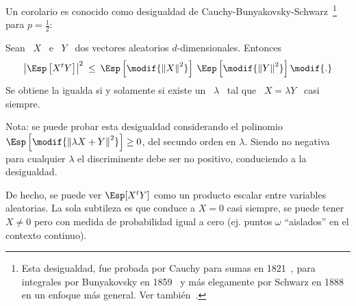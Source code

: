 Un       corolario       es       conocido       como       desigualdad       de
Cauchy-Bunyakovsky-Schwarz~\footnote{Esta  desigualdad, fue  probada  por Cauchy
  para  sumas   en  1821~\cite{Cau21},   para  integrales  por   Bunyakovsky  en
  1859~\cite{Bou59} y  m\'as elegamente por  Schwarz en 1888~\cite{Sch88}  en un
  enfoque m\'as general. Ver tambi\'en~\cite{Ste04}.} para $p = \frac12$:
%
\begin{corolario}
\label{Cor:MP:DesigualdadCauchySchwarz}
%
  Sean \  $X$ \ e \  $Y$ \ dos vectores  aleatorios $d$-dimensionales. Entonces
  \[
  \left|  \Esp\left[  X^t Y  \right]  \right|^2 \:  \le  \:  \Esp\left[ \modif{\left\|  X
    \right\|^2}   \right]  \:  \Esp\left[   \modif{\left\|  Y
    \right\|^2} \right]\modif{.}
  \]
  Se obtiene la igualda si y solamente si existe un \ $\lambda$ \ tal que \ $X =
  \lambda Y$ \ casi siempre.
\end{corolario}
%
Nota:  se puede probar  esta desigualdad  considerando el  polinomio $\Esp\left[
  \modif{\left\| \lambda X + Y \right\|^2}  \right] \ge 0$, del secundo orden en
$\lambda$. Siendo no negativa para cualquier $\lambda$ el discriminente debe ser
no positivo, conduciendo a la desigualdad.

De hecho,  se puede ver $\Esp[X^t  Y]$ como un producto  escalar entre variables
aleatorias. La sola subtileza es que  
conduce a $X = 0$ casi siempre, \ie  se puede tener $X \ne 0$ pero con medida de
probabilidad  igual a  cero (ej.  puntos  $\omega$ ``aislados''  en el  contexto
continuo).



